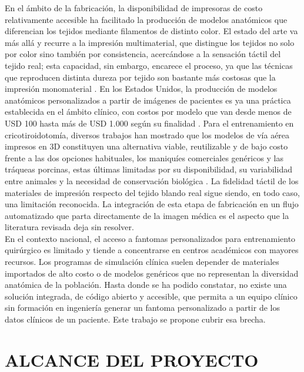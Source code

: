 En el ámbito de la fabricación, la disponibilidad de impresoras de costo relativamente accesible ha facilitado la producción de modelos anatómicos que diferencian los tejidos mediante filamentos de distinto color. El estado del arte va más allá y recurre a la impresión multimaterial, que distingue los tejidos no solo por color sino también por consistencia, acercándose a la sensación táctil del tejido real; esta capacidad, sin embargo, encarece el proceso, ya que las técnicas que reproducen distinta dureza por tejido son bastante más costosas que la impresión monomaterial \citep{chen2020multicolor}. En los Estados Unidos, la producción de modelos anatómicos personalizados a partir de imágenes de pacientes es ya una práctica establecida en el ámbito clínico, con costos por modelo que van desde menos de USD 100 hasta más de USD 1.000 según su finalidad \citep{sun2023lowcost}. Para el entrenamiento en cricotiroidotomía, diversos trabajos han mostrado que los modelos de vía aérea impresos en 3D constituyen una alternativa viable, reutilizable y de bajo costo frente a las dos opciones habituales, los maniquíes comerciales genéricos y las tráqueas porcinas, estas últimas limitadas por su disponibilidad, su variabilidad entre animales y la necesidad de conservación biológica \citep{doucet2017trachea}. La fidelidad táctil de los materiales de impresión respecto del tejido blando real sigue siendo, en todo caso, una limitación reconocida. La integración de esta etapa de fabricación en un flujo automatizado que parta directamente de la imagen médica es el aspecto que la literatura revisada deja sin resolver.\\

En el contexto nacional, el acceso a fantomas personalizados para entrenamiento quirúrgico es limitado y tiende a concentrarse en centros académicos con mayores recursos. Los programas de simulación clínica suelen depender de materiales importados de alto costo o de modelos genéricos que no representan la diversidad anatómica de la población. Hasta donde se ha podido constatar, no existe una solución integrada, de código abierto y accesible, que permita a un equipo clínico sin formación en ingeniería generar un fantoma personalizado a partir de los datos clínicos de un paciente. Este trabajo se propone cubrir esa brecha.\\

\section{ALCANCE DEL PROYECTO}

